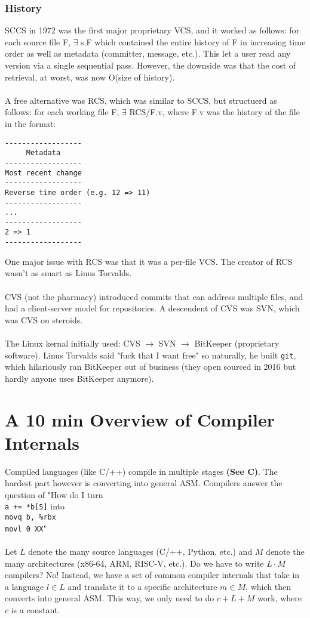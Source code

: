 \documentclass[13pt]{article}
\begin{document}
\subsubsection{History}
SCCS in 1972 was the first major proprietary VCS, and it worked as follows: for each source file F, $\exists$ s.F which contained the entire history of F in increasing time order as well as metadata (committer, message, etc.). This let a user read any version via a single sequential pass. However, the downside was that the cost of retrieval, at worst, was now O(size of history). \\ \\
A free alternative was RCS, which was similar to SCCS, but structuerd as follows: for each working file F, $\exists$ RCS/F.v, where F.v was the history of the file in the format:
\begin{verbatim}
------------------
     Metadata
------------------
Most recent change
------------------
Reverse time order (e.g. 12 => 11)
------------------
...
------------------
2 => 1
------------------
\end{verbatim}
One major issue with RCS was that it was a per-file VCS. The creator of RCS wasn't as smart as Linus Torvalds. \\ \\
CVS (not the pharmacy) introduced commits that can address multiple files, and had a client-server model for repositories. A descendent of CVS was SVN, which was CVS on steroids. \\ \\
The Linux kernal initially used: CVS $\rightarrow$ SVN $\rightarrow$ BitKeeper (proprietary software). Linus Torvalds said "fuck that I want free" so naturally, he built \texttt{git}, which hilariously ran BitKeeper out of business (they open sourced in 2016 but hardly anyone uses BitKeeper anymore).





\section{A 10 min Overview of Compiler Internals}
Compiled languages (like C/++) compile in multiple stages \textbf{(See C)}. The hardest part however is converting into general ASM. Compilers answer the question of "How do I turn \\ \texttt{a += *b[5]} into \\ \texttt{movq b, \%rbx \\movl 0 XX}" \\ \\
Let $L$ denote the many source languages (C/++, Python, etc.) and $M$ denote the many architectures (x86-64, ARM, RISC-V, etc.). Do we have to write $L \cdot M$ compilers? No! Instead, we have a set of common compiler internals that take in a language $l \in L$ and translate it to a specific architecture $m \in M$, which then converts into general ASM. This way, we only need to do $c + L + M$ work, where $c$ is a constant.
\end{document}

